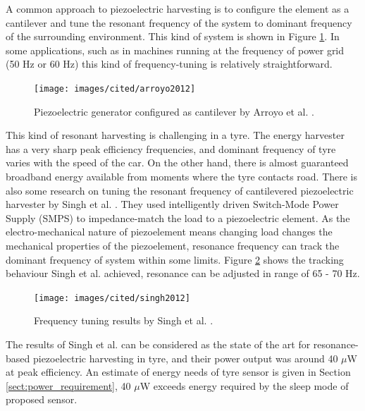 A common approach to piezoelectric harvesting is to configure the element as a cantilever and tune the resonant frequency of the system to dominant frequency of the surrounding environment. This kind of system is shown in Figure \ref{fiq:resonant_piezo}. In some applications, such as in machines running at the frequency of power grid (50 Hz or 60 Hz) this kind of frequency-tuning is relatively straightforward.

\begin{figure}[htb]
  \begin{center}
  \texttt{[image: images/cited/arroyo2012]}
  \end{center}
  \caption{Piezoelectric generator configured as cantilever by Arroyo et al. \cite{Arroyo2012}.}
  \label{fiq:resonant_piezo}
\end{figure}

This kind of resonant harvesting is challenging in a tyre. The energy harvester has a very sharp peak efficiency frequencies, and dominant frequency of tyre varies with the speed of the car. On the other hand, there is almost guaranteed broadband energy available from moments where the tyre contacts road. There is also some research on tuning the resonant frequency of cantilevered piezoelectric harvester by Singh et al. \cite{Singh2012}. They used intelligently driven Switch-Mode Power Supply (SMPS) to impedance-match the load to a piezoelectric element. As the electro-mechanical nature of piezoelement means changing load changes the mechanical properties of the piezoelement, resonance frequency can track the dominant frequency of system within some limits. Figure \ref{fiq:tracking_piezo} shows the tracking behaviour Singh et al. achieved, resonance can be adjusted in range of 65 - 70 Hz.

\begin{figure}[htb]
  \begin{center}
  \texttt{[image: images/cited/singh2012]}
  \end{center}
  \caption{Frequency tuning results by Singh et al. \cite{Singh2012}.}
  \label{fiq:tracking_piezo}
\end{figure}

The results of Singh et al. can be considered as the state of the art for resonance-based piezoelectric harvesting in tyre, and their power output was around 40 $\mu$W at peak efficiency. An estimate of energy needs of tyre sensor is given in Section \ref{sect:power_requirement}, 40 $\mu$W exceeds energy required by the sleep mode of proposed sensor.

